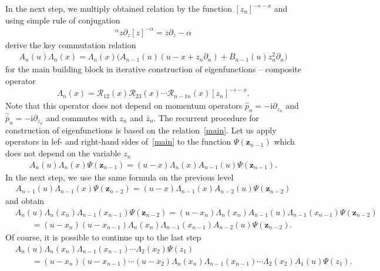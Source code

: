 \documentclass[pdftex]{sigma}
\renewcommand{\imath}{\mathrm{i}}
\numberwithin{equation}{section}
\begin{document}
In the next step, we multiply obtained relation by the function $[z_n]^{-s-x}$
and using simple rule of conjugation
\begin{align*}
[z]^{\alpha} z\partial_{z} [z]^{-\alpha} = z\partial_{z} -\alpha
\end{align*}
derive the key commutation relation
\begin{align}\label{main}
A_{n}(u) \Lambda_n( x) =
\Lambda_n( x) \bigl(A_{n-1}(u) (u-x+z_n \partial_n)
+ B_{n-1}(u) z_n^2 \partial_n \bigl)
\end{align}
for the main building block in iterative construction of eigenfunctions -- composite operator
\begin{align*}
\Lambda_n( x) = \mathcal{R}_{12}( x)\mathcal{R}_{23}( x)\cdots
\mathcal{R}_{n-1 n}( x) [z_n]^{-s-x} .
\end{align*}
Note that this operator does not depend on
momentum operators $\hat{p}_n = -\imath\partial_{z_n}$ and
$\hat{\bar{p}}_n = -\imath\partial_{\bar{z}_n}$ and commutes with $z_n$ and $\bar{z}_n$.
The recurrent procedure for construction of eigenfunctions
is based on the relation~\eqref{main}.
Let us apply operators in lef- and right-hand sides of~\eqref{main} to the function
$\Psi(\bm z_{n-1})$ which does not depend on the variable $z_n$
\begin{align*}
A_{n}(u) \Lambda_n( x)
\Psi(\bm z_{n-1}) =
(u-x) \Lambda_n( x)
A_{n-1}(u)\Psi(\bm z_{n-1}) .
\end{align*}
In the next step, we use the same formula on the previous level
\begin{align*}
A_{n-1}(u) \Lambda_{n-1}( x)
\Psi(\bm z_{n-2}) =
(u-x) \Lambda_{n-1}( x)
A_{n-2}(u)\Psi(\bm z_{n-2})
\end{align*}
and obtain
\begin{align*}
&A_{n}(u) \Lambda_n( x_n)\Lambda_{n-1}( x_{n-1})
\Psi(\bm z_{n-2})=
(u-x_n) \Lambda_n( x_n)
A_{n-1}(u) \Lambda_{n-1}( x_{n-1})\Psi(\bm z_{n-2}) \\
&\qquad =
(u-x_n) (u-x_{n-1}) \Lambda_n( x_n)
\Lambda_{n-1}( x_{n-1})
A_{n-2}(u) \Psi(\bm z_{n-2}).
\end{align*}
Of course, it is possible to continue up to the last step
\begin{align*}
&
A_{n}(u) \Lambda_n( x_n)
\Lambda_{n-1}( x_{n-1})\cdots
\Lambda_{2}( x_{2}) \Psi(z_1)
\\
& \qquad
= (u-x_n)(u-x_{n-1})\cdots(u-x_2)
\Lambda_n( x_n)
\Lambda_{n-1}( x_{n-1})\cdots
\Lambda_{2}( x_{2}) A_{1}(u) \Psi(z_1) .
\end{align*}
\end{document}
